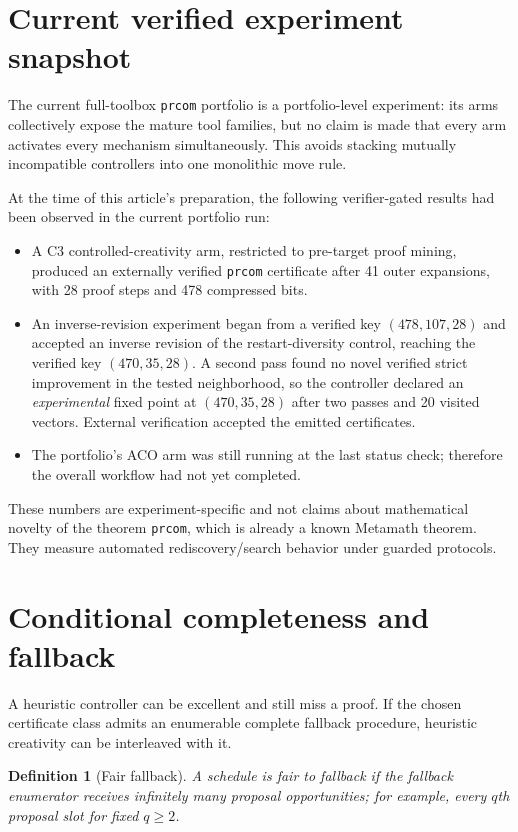 \documentclass[11pt]{article}
\newtheorem{definition}[theorem]{Definition}
\begin{document}
\section{Current verified experiment snapshot}

The current full-toolbox \texttt{prcom} portfolio is a portfolio-level experiment: its arms collectively expose the mature tool families, but no claim is made that every arm activates every mechanism simultaneously. This avoids stacking mutually incompatible controllers into one monolithic move rule.

At the time of this article's preparation, the following verifier-gated results had been observed in the current portfolio run:
\begin{itemize}
\item A C3 controlled-creativity arm, restricted to pre-target proof mining, produced an externally verified \texttt{prcom} certificate after 41 outer expansions, with 28 proof steps and 478 compressed bits.
\item An inverse-revision experiment began from a verified key $(478,107,28)$ and accepted an inverse revision of the restart-diversity control, reaching the verified key $(470,35,28)$. A second pass found no novel verified strict improvement in the tested neighborhood, so the controller declared an \emph{experimental} fixed point at $(470,35,28)$ after two passes and 20 visited vectors. External verification accepted the emitted certificates.
\item The portfolio's ACO arm was still running at the last status check; therefore the overall workflow had not yet completed.
\end{itemize}
These numbers are experiment-specific and not claims about mathematical novelty of the theorem \texttt{prcom}, which is already a known Metamath theorem. They measure automated rediscovery/search behavior under guarded protocols.

\section{Conditional completeness and fallback}

A heuristic controller can be excellent and still miss a proof. If the chosen certificate class admits an enumerable complete fallback procedure, heuristic creativity can be interleaved with it.

\begin{definition}[Fair fallback]
A schedule is fair to fallback if the fallback enumerator receives infinitely many proposal opportunities; for example, every $q$th proposal slot for fixed $q\ge2$.
\end{definition}
\end{document}
